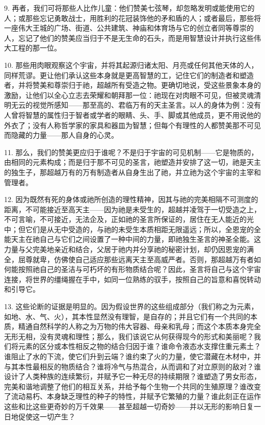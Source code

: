 9. 再者，我们可将那些人比作儿童：他们赞美七弦琴，却忽略发明或能使用它的人；或那些忘记勇敢战士，用胜利的花冠装饰他的矛和盾的人；或者最后，那些将一座伟大王城的广场、街道、公共建筑、神庙和体育场与它的创立者同等尊崇的人，忘记了他们的赞美应当归于不是无生命的石头，而是用智慧设计并执行这些伟大工程的那一位。\par

10. 那些用肉眼观察这个宇宙，并将其起源归诸太阳、月亮或任何其他天体的人，同样荒谬。更让他们承认这些本身就是更高智慧的工，记住它们的制造者和塑造者，并将赞美和尊崇归于祂，超越所有受造之物。更确切地说，受这些景象本身的激励，让他们以全心立志去荣耀和朝拜那一位：祂现在对肉眼不可见，但被灵魂清明无云的视觉所感知——那至高的、君临万有的天主圣言。以人的身体为例：没有人曾将智慧的属性归于智者或学者的眼睛、头、手、脚或其他成员，更不用说他的外衣了；没有人称哲学家的家具和器皿为智慧；但每个有理性的人都赞美那不可见而隐藏的力量——那人自身的心灵。\par

11. 那么，我们的赞美更应归于谁呢？不是归于宇宙的可见机制——它是物质的，由相同的元素构成；而是归于那不可见的圣言，祂塑造并安排了这一切，祂是天主的独生子，那超越万有的万有制造者从自身生出了祂，并立祂为这个宇宙的主宰和管理者。\par

12. 因为既然有死的身体或祂所创造的理性精神，因其与祂的完美相隔不可测度的距离，不可能接近至高天主——因为祂是未受生的，超越并凌驾于一切受造之上，不可言喻，不可接近，无法企及，正如祂的圣言所保证的，居住在无人能近的光中；但它们是从无中受造的，与祂的未受生本质相距无限遥远；所以，全恩宠的全能天主在祂自己与它们之间设置了一种中间的力量，即祂独生圣言的神圣全能。这力量与父完美地亲近和结合，父居于祂内并分享祂的秘密计划，却仍因恩宠的满全，屈尊就卑，仿佛使自己适应那些远离天主至高威严者。否则，那超越万有者如何能按照祂自己的圣洁与可朽坏的有形物质结合呢？因此，圣言将自己与这个宇宙连接，将世界的缰绳握在手中，如同一位熟练的驭手，按照自己的旨意和喜悦转动和引导它。\par

13. 这些论断的证据是明显的。因为假设世界的这些组成部分（我们称之为元素，如地、水、气、火），其本性显然没有理智，是自存的；并且它们有一个共同的本质，精通自然科学的人称之为万物的伟大容器、母亲和乳母；而这个本质本身完全无形无相，没有灵魂和理性；那么，我们该说它从何获得现今的形式和美丽呢？我们将元素的区分或本性相反之物的结合归因于谁？谁命令液态水支撑住重元素土？谁阻止了水的下流，使它们升到云端？谁约束了火的力量，使它潜藏在木材中，并与其本性最相反的物质结合？谁将冷气与热混合，从而调和了对立原则的敌对？谁设计了人类种族的连续繁衍，并赋予它一种无尽的持续期限？谁塑造了男女形态，完美和谐地调整了他们的相互关系，并给予每个生物一个共同的生殖原理？谁改变了流动易朽、本身缺乏理性的种子的特性，并赋予它繁殖的力量？谁此刻正在运作这些和比这些更奇妙的万千效果——甚至超越一切奇妙——并以无形的影响日复一日地促使这一切产生？\par

